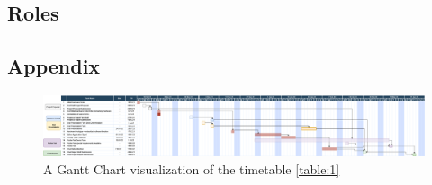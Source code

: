 \documentclass[11pt,letterpaper]{article}
\begin{document}
\newpage
\begin{flushleft}
\justifying


























\section{Roles}

\end{flushleft}
\begin{landscape}

\section*{Appendix}
\begin{figure}[htbp]
\centering
\includegraphics[width=\textwidth]{Project_Proposal/figs/projectproposalGantt.png}
\caption{A Gantt Chart visualization of the timetable \ref{table:1}}
\label{fig:Appendix}
\end{figure}
\end{landscape}


\end{document}
